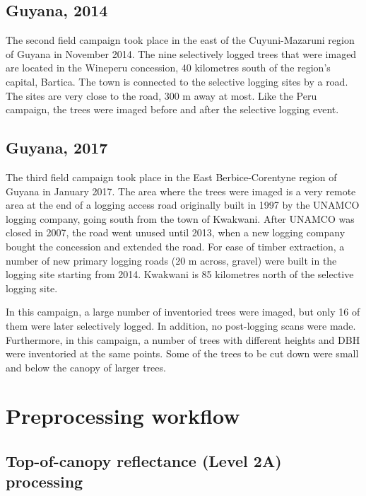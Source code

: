 \documentclass[a4paper,12pt]{scrbook}
\begin{document}
\subsection{Guyana, 2014}

The second field campaign took place in the east of the Cuyuni-Mazaruni region of Guyana in November 2014. The nine selectively logged trees that were imaged are located in the Wineperu concession, 40 kilometres south of the region's capital, Bartica. The town is connected to the selective logging sites by a road. The sites are very close to the road, 300 m away at most. Like the Peru campaign, the trees were imaged before and after the selective logging event.


\subsection{Guyana, 2017}

The third field campaign took place in the East Berbice-Corentyne region of Guyana in January 2017. The area where the trees were imaged is a very remote area at the end of a logging access road originally built in 1997 by the UNAMCO logging company, going south from the town of Kwakwani. After UNAMCO was closed in 2007, the road went unused until 2013, when a new logging company bought the concession and extended the road. For ease of timber extraction, a number of new primary logging roads (20 m across, gravel) were built in the logging site starting from 2014. Kwakwani is 85 kilometres north of the selective logging site.

In this campaign, a large number of inventoried trees were imaged, but only 16 of them were later selectively logged. In addition, no post-logging scans were made. Furthermore, in this campaign, a number of trees with different heights and \ac{DBH} were inventoried at the same points. Some of the trees to be cut down were small and below the canopy of larger trees.


\section{Preprocessing workflow}

\subsection{Top-of-canopy reflectance (Level 2A) processing}
\end{document}

